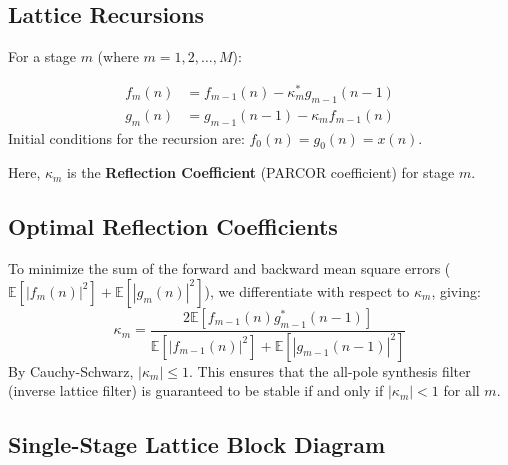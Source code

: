\documentclass[12pt,a4paper]{article}
\begin{document}
\subsection{Lattice Recursions}
For a stage $m$ (where $m=1, 2, \dots, M$):
\begin{tcolorbox}[defbox, title={Lattice Prediction Error Updates}]
\begin{align}
  f_m(n) &= f_{m-1}(n) - \kappa_m^* g_{m-1}(n-1) \\
  g_m(n) &= g_{m-1}(n-1) - \kappa_m f_{m-1}(n)
\end{align}
Initial conditions for the recursion are: $f_0(n) = g_0(n) = x(n)$.
\end{tcolorbox}
Here, $\kappa_m$ is the \textbf{Reflection Coefficient} (PARCOR coefficient) for stage $m$.

\subsection{Optimal Reflection Coefficients}
To minimize the sum of the forward and backward mean square errors ($\mathbb{E}[|f_m(n)|^2] + \mathbb{E}[|g_m(n)|^2]$), we differentiate with respect to $\kappa_m$, giving:
\begin{equation}
  \kappa_m = \frac{2\mathbb{E}[f_{m-1}(n) g_{m-1}^*(n-1)]}{\mathbb{E}[|f_{m-1}(n)|^2] + \mathbb{E}[|g_{m-1}(n-1)|^2]}
\end{equation}
By Cauchy-Schwarz, $|\kappa_m| \le 1$. This ensures that the all-pole synthesis filter (inverse lattice filter) is guaranteed to be stable if and only if $|\kappa_m| < 1$ for all $m$.

\subsection{Single-Stage Lattice Block Diagram}
\end{document}
